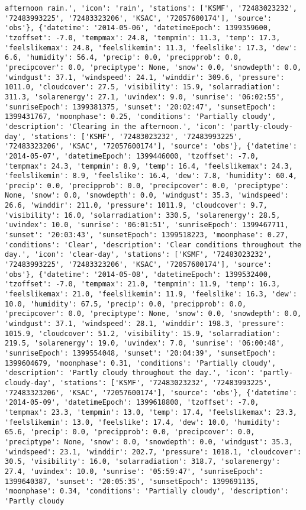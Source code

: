 \documentclass[
  letterpaper,
  DIV=11,
  numbers=noendperiod]{scrartcl}
\begin{document}
\begin{verbatim}
afternoon rain.', 'icon': 'rain', 'stations': ['KSMF', '72483023232', '72483993225', '72483323206', 'KSAC', '72057600174'], 'source': 'obs'}, {'datetime': '2014-05-06', 'datetimeEpoch': 1399359600, 'tzoffset': -7.0, 'tempmax': 24.8, 'tempmin': 11.3, 'temp': 17.3, 'feelslikemax': 24.8, 'feelslikemin': 11.3, 'feelslike': 17.3, 'dew': 6.6, 'humidity': 56.4, 'precip': 0.0, 'precipprob': 0.0, 'precipcover': 0.0, 'preciptype': None, 'snow': 0.0, 'snowdepth': 0.0, 'windgust': 37.1, 'windspeed': 24.1, 'winddir': 309.6, 'pressure': 1011.0, 'cloudcover': 27.5, 'visibility': 15.9, 'solarradiation': 311.3, 'solarenergy': 27.1, 'uvindex': 9.0, 'sunrise': '06:02:55', 'sunriseEpoch': 1399381375, 'sunset': '20:02:47', 'sunsetEpoch': 1399431767, 'moonphase': 0.25, 'conditions': 'Partially cloudy', 'description': 'Clearing in the afternoon.', 'icon': 'partly-cloudy-day', 'stations': ['KSMF', '72483023232', '72483993225', '72483323206', 'KSAC', '72057600174'], 'source': 'obs'}, {'datetime': '2014-05-07', 'datetimeEpoch': 1399446000, 'tzoffset': -7.0, 'tempmax': 24.3, 'tempmin': 8.9, 'temp': 16.4, 'feelslikemax': 24.3, 'feelslikemin': 8.9, 'feelslike': 16.4, 'dew': 7.8, 'humidity': 60.4, 'precip': 0.0, 'precipprob': 0.0, 'precipcover': 0.0, 'preciptype': None, 'snow': 0.0, 'snowdepth': 0.0, 'windgust': 35.3, 'windspeed': 26.6, 'winddir': 211.0, 'pressure': 1011.9, 'cloudcover': 9.7, 'visibility': 16.0, 'solarradiation': 330.5, 'solarenergy': 28.5, 'uvindex': 10.0, 'sunrise': '06:01:51', 'sunriseEpoch': 1399467711, 'sunset': '20:03:43', 'sunsetEpoch': 1399518223, 'moonphase': 0.27, 'conditions': 'Clear', 'description': 'Clear conditions throughout the day.', 'icon': 'clear-day', 'stations': ['KSMF', '72483023232', '72483993225', '72483323206', 'KSAC', '72057600174'], 'source': 'obs'}, {'datetime': '2014-05-08', 'datetimeEpoch': 1399532400, 'tzoffset': -7.0, 'tempmax': 21.0, 'tempmin': 11.9, 'temp': 16.3, 'feelslikemax': 21.0, 'feelslikemin': 11.9, 'feelslike': 16.3, 'dew': 10.0, 'humidity': 67.5, 'precip': 0.0, 'precipprob': 0.0, 'precipcover': 0.0, 'preciptype': None, 'snow': 0.0, 'snowdepth': 0.0, 'windgust': 37.1, 'windspeed': 28.1, 'winddir': 198.3, 'pressure': 1015.9, 'cloudcover': 51.2, 'visibility': 15.9, 'solarradiation': 219.5, 'solarenergy': 19.0, 'uvindex': 7.0, 'sunrise': '06:00:48', 'sunriseEpoch': 1399554048, 'sunset': '20:04:39', 'sunsetEpoch': 1399604679, 'moonphase': 0.31, 'conditions': 'Partially cloudy', 'description': 'Partly cloudy throughout the day.', 'icon': 'partly-cloudy-day', 'stations': ['KSMF', '72483023232', '72483993225', '72483323206', 'KSAC', '72057600174'], 'source': 'obs'}, {'datetime': '2014-05-09', 'datetimeEpoch': 1399618800, 'tzoffset': -7.0, 'tempmax': 23.3, 'tempmin': 13.0, 'temp': 17.4, 'feelslikemax': 23.3, 'feelslikemin': 13.0, 'feelslike': 17.4, 'dew': 10.0, 'humidity': 65.6, 'precip': 0.0, 'precipprob': 0.0, 'precipcover': 0.0, 'preciptype': None, 'snow': 0.0, 'snowdepth': 0.0, 'windgust': 35.3, 'windspeed': 23.1, 'winddir': 202.7, 'pressure': 1018.1, 'cloudcover': 30.5, 'visibility': 16.0, 'solarradiation': 318.7, 'solarenergy': 27.4, 'uvindex': 10.0, 'sunrise': '05:59:47', 'sunriseEpoch': 1399640387, 'sunset': '20:05:35', 'sunsetEpoch': 1399691135, 'moonphase': 0.34, 'conditions': 'Partially cloudy', 'description': 'Partly cloudy 
\end{verbatim}
\end{document}
